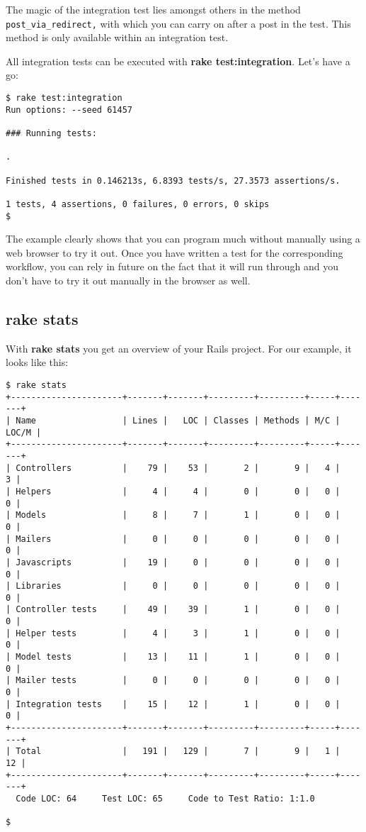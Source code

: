 \documentclass[a4paper]{book}
\begin{document}
The magic of the integration test lies amongst others in the method \texttt{post\_via\_redirect,} with which you can carry on after a post in the test. This method is only available within an integration test.

All integration tests can be executed with \textbf{rake test:integration}. Let's have a go:

\begin{shaded}\begin{verbatim}
$ rake test:integration
Run options: --seed 61457

### Running tests:

.

Finished tests in 0.146213s, 6.8393 tests/s, 27.3573 assertions/s.

1 tests, 4 assertions, 0 failures, 0 errors, 0 skips
$
\end{verbatim}\end{shaded}

The example clearly shows that you can program much without manually using a web browser to try it out. Once you have written a test for the corresponding workflow, you can rely in future on the fact that it will run through and you don't have to try it out manually in the browser as well.

\subsection{rake stats}\label{rake-stats}

With \textbf{rake stats} you get an overview of your Rails project. For our example, it looks like this:

\begin{shaded}\begin{verbatim}
$ rake stats
+----------------------+-------+-------+---------+---------+-----+-------+
| Name                 | Lines |   LOC | Classes | Methods | M/C | LOC/M |
+----------------------+-------+-------+---------+---------+-----+-------+
| Controllers          |    79 |    53 |       2 |       9 |   4 |     3 |
| Helpers              |     4 |     4 |       0 |       0 |   0 |     0 |
| Models               |     8 |     7 |       1 |       0 |   0 |     0 |
| Mailers              |     0 |     0 |       0 |       0 |   0 |     0 |
| Javascripts          |    19 |     0 |       0 |       0 |   0 |     0 |
| Libraries            |     0 |     0 |       0 |       0 |   0 |     0 |
| Controller tests     |    49 |    39 |       1 |       0 |   0 |     0 |
| Helper tests         |     4 |     3 |       1 |       0 |   0 |     0 |
| Model tests          |    13 |    11 |       1 |       0 |   0 |     0 |
| Mailer tests         |     0 |     0 |       0 |       0 |   0 |     0 |
| Integration tests    |    15 |    12 |       1 |       0 |   0 |     0 |
+----------------------+-------+-------+---------+---------+-----+-------+
| Total                |   191 |   129 |       7 |       9 |   1 |    12 |
+----------------------+-------+-------+---------+---------+-----+-------+
  Code LOC: 64     Test LOC: 65     Code to Test Ratio: 1:1.0

$
\end{verbatim}\end{shaded}
\end{document}
